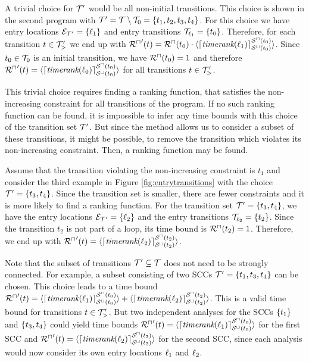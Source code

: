 A trivial choice for $\mathcal{T}'$ would be all non-initial transitions.
This choice is shown in the second program with $\mathcal{T}' = \mathcal{T} \setminus \mathcal{T}_0 = \lbrace t_1, t_2, t_3, t_4 \rbrace$.
For this choice we have entry locations $\mathcal{E}_{\mathcal{T}'} = \lbrace \ell_1 \rbrace$ and entry transitions $\mathcal{T}_{\ell_1} = \lbrace t_0 \rbrace$.
Therefore, for each transition $t \in \mathcal{T}'_>$ we end up with ${\mathcal{R}^\sqcap}'(t) = {\mathcal{R}^\sqcap}(t_0) \cdot \langle\lceil \emph{timerank}(\ell_1) \rceil^{{\mathcal{S}^\sqcap}(t_0)}_{{\mathcal{S}^\sqcup}(t_0)}\rangle$.
Since $t_0 \in \mathcal{T}_0$ is an initial transition, we have ${\mathcal{R}^\sqcap}(t_0) = 1$ and therefore ${\mathcal{R}^\sqcap}'(t) = \langle\lceil \emph{timerank}(\ell_0) \rceil^{{\mathcal{S}^\sqcap}(t_0)}_{{\mathcal{S}^\sqcup}(t_0)}\rangle$ for all transitions $t \in \mathcal{T}'_>$.

This trivial choice requires finding a ranking function, that satisfies the non-increasing constraint for all transitions of the program.
If no such ranking function can be found, it is impossible to infer any time bounds with this choice of the transition set $\mathcal{T}'$.
But since the method allows us to consider a subset of these transitions, it might be possible, to remove the transition which violates its non-increasing constraint.
Then, a ranking function may be found.

Assume that the transition violating the non-increasing constraint is $t_1$ and consider the third example in Figure \ref{fig:entrytransitions} with the choice $\mathcal{T}' = \lbrace t_3, t_4 \rbrace$.
Since the transition set is smaller, there are fewer constraints and it is more likely to find a ranking function.
For the transition set $\mathcal{T}' = \lbrace t_3, t_4 \rbrace$, we have the entry locations $\mathcal{E}_{\mathcal{T}'} = \lbrace \ell_2 \rbrace$ and the entry transitions $\mathcal{T}_{\ell_2} = \lbrace t_2 \rbrace$.
Since the transition $t_2$ is not part of a loop, its time bound is ${\mathcal{R}^\sqcap}(t_2) = 1$.
Therefore, we end up with ${\mathcal{R}^\sqcap}'(t) = \langle\lceil \emph{timerank}(\ell_2) \rceil^{{\mathcal{S}^\sqcap}(t_2)}_{{\mathcal{S}^\sqcup}(t_2)}\rangle$.

Note that the subset of transitions $\mathcal{T}' \subseteq \mathcal{T}$ does not need to be strongly connected.
For example, a subset consisting of two SCCs $\mathcal{T}' = \lbrace t_1, t_3, t_4 \rbrace$ can be chosen.
This choice leads to a time bound ${\mathcal{R}^\sqcap}'(t) = \langle\lceil \emph{timerank}(\ell_1) \rceil^{{\mathcal{S}^\sqcap}(t_0)}_{{\mathcal{S}^\sqcup}(t_0)}\rangle + \langle\lceil \emph{timerank}(\ell_2) \rceil^{{\mathcal{S}^\sqcap}(t_2)}_{{\mathcal{S}^\sqcup}(t_2)}\rangle$.
This is a valid time bound for transitions $t \in \mathcal{T}'_>$.
But two independent analyses for the SCCs $\lbrace t_1 \rbrace$ and $\lbrace t_3, t_4 \rbrace$ could yield time bounds ${\mathcal{R}^\sqcap}'(t) = \langle\lceil \emph{timerank}(\ell_1) \rceil^{{\mathcal{S}^\sqcap}(t_0)}_{{\mathcal{S}^\sqcup}(t_0)}\rangle$ for the first SCC and ${\mathcal{R}^\sqcap}'(t) = \langle\lceil \emph{timerank}(\ell_2) \rceil^{{\mathcal{S}^\sqcap}(t_2)}_{{\mathcal{S}^\sqcup}(t_2)}\rangle$ for the second SCC, since each analysis would now consider its own entry locations $\ell_1$ and $\ell_2$.

